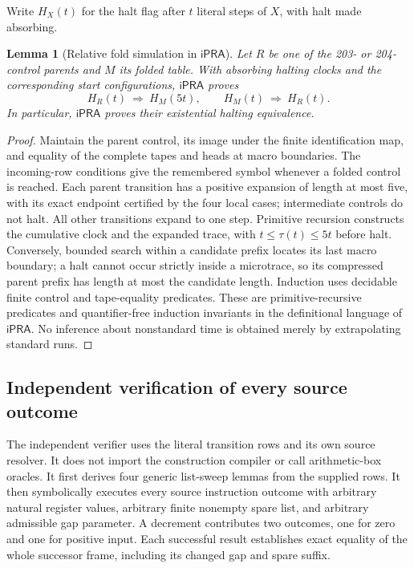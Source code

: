 \documentclass[11pt,letterpaper]{article}
\newtheorem{lemma}[theorem]{Lemma}
\theoremstyle{definition}
\newcommand{\ipra}{\mathsf{iPRA}}
\begin{document}
Write $H_X(t)$ for the halt flag after $t$ literal steps of $X$, with
halt made absorbing.

\begin{lemma}[Relative fold simulation in $\ipra$]
Let $R$ be one of the 203- or 204-control parents and $M$ its folded table.
With absorbing halting clocks and the corresponding start configurations,
$\ipra$ proves
\[
 H_R(t)\ \Longrightarrow\ H_M(5t),\qquad
 H_M(t)\ \Longrightarrow\ H_R(t).
\]
In particular, $\ipra$ proves their existential halting equivalence.
\end{lemma}
\begin{proof}
Maintain the parent control, its image under the finite identification map,
and equality of the complete tapes and heads at macro boundaries. The
incoming-row conditions give the remembered symbol whenever a folded
control is reached. Each parent transition has a positive expansion of
length at most five, with its exact endpoint certified by the four local
cases; intermediate controls do not halt. All other transitions expand to
one step. Primitive recursion constructs the cumulative clock and the
expanded trace, with $t\leq\tau(t)\leq5t$ before halt. Conversely, bounded
search within a candidate prefix locates its last macro boundary; a halt
cannot occur strictly inside a microtrace, so its compressed parent prefix
has length at most the candidate length. Induction uses decidable finite
control and tape-equality predicates. These are primitive-recursive
predicates and quantifier-free induction invariants in the definitional
language of $\ipra$. No inference about nonstandard time is obtained merely
by extrapolating standard runs.
\end{proof}

\subsection{Independent verification of every source outcome}
The independent verifier uses the literal transition rows and its own
source resolver. It does not import the construction compiler or call
arithmetic-box oracles. It first derives four generic list-sweep lemmas
from the supplied rows. It then symbolically executes every source
instruction outcome with arbitrary natural register values, arbitrary
finite nonempty spare list, and arbitrary admissible gap parameter. A
decrement contributes two outcomes, one for zero and one for positive
input. Each successful result establishes exact equality of the whole
successor frame, including its changed gap and spare suffix.
\end{document}
